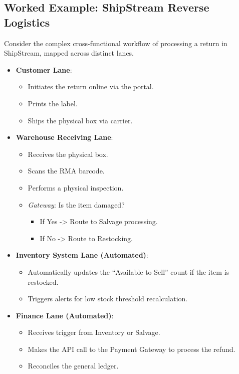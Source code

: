 \documentclass[
  11pt,
  openany,
  oneside]{book}
\providecommand{\tightlist}{%
  \setlength{\itemsep}{0pt}\setlength{\parskip}{0pt}}
\begin{document}
\subsection{Worked Example: ShipStream Reverse
Logistics}\label{worked-example-shipstream-reverse-logistics}

Consider the complex cross-functional workflow of processing a return in
ShipStream, mapped across distinct lanes.

\begin{itemize}
\tightlist
\item
  \textbf{Customer Lane}:

  \begin{itemize}
  \tightlist
  \item
    Initiates the return online via the portal.
  \item
    Prints the label.
  \item
    Ships the physical box via carrier.
  \end{itemize}
\item
  \textbf{Warehouse Receiving Lane}:

  \begin{itemize}
  \tightlist
  \item
    Receives the physical box.
  \item
    Scans the RMA barcode.
  \item
    Performs a physical inspection.
  \item
    \emph{Gateway}: Is the item damaged?

    \begin{itemize}
    \tightlist
    \item
      If Yes -\textgreater{} Route to Salvage processing.
    \item
      If No -\textgreater{} Route to Restocking.
    \end{itemize}
  \end{itemize}
\item
  \textbf{Inventory System Lane (Automated)}:

  \begin{itemize}
  \tightlist
  \item
    Automatically updates the ``Available to Sell'' count if the item is
    restocked.
  \item
    Triggers alerts for low stock threshold recalculation.
  \end{itemize}
\item
  \textbf{Finance Lane (Automated)}:

  \begin{itemize}
  \tightlist
  \item
    Receives trigger from Inventory or Salvage.
  \item
    Makes the API call to the Payment Gateway to process the refund.
  \item
    Reconciles the general ledger.
  \end{itemize}
\end{itemize}
\end{document}
